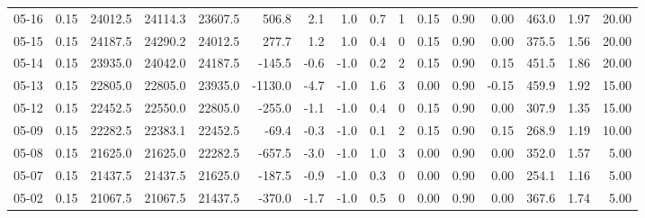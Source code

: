 \begin{threeparttable}
{\begin{tabular}{lrrrrrrrrrrrrrrr}
  05-16 &     0.15 & 24012.5 & 24114.3 & 23607.5 &      506.8 &            2.1 &                      1.0 &                 0.7 &              1 &       0.15 &      0.90 &           0.00 &            463.0 &            1.97 &                  20.00 \\
  05-15 &     0.15 & 24187.5 & 24290.2 & 24012.5 &      277.7 &            1.2 &                      1.0 &                 0.4 &              0 &       0.15 &      0.90 &           0.00 &            375.5 &            1.56 &                  20.00 \\
  05-14 &     0.15 & 23935.0 & 24042.0 & 24187.5 &     -145.5 &           -0.6 &                     -1.0 &                 0.2 &              2 &       0.15 &      0.90 &           0.15 &            451.5 &            1.86 &                  20.00 \\
  05-13 &     0.15 & 22805.0 & 22805.0 & 23935.0 &    -1130.0 &           -4.7 &                     -1.0 &                 1.6 &              3 &       0.00 &      0.90 &          -0.15 &            459.9 &            1.92 &                  15.00 \\
  05-12 &     0.15 & 22452.5 & 22550.0 & 22805.0 &     -255.0 &           -1.1 &                     -1.0 &                 0.4 &              0 &       0.15 &      0.90 &           0.00 &            307.9 &            1.35 &                  15.00 \\
  05-09 &     0.15 & 22282.5 & 22383.1 & 22452.5 &      -69.4 &           -0.3 &                     -1.0 &                 0.1 &              2 &       0.15 &      0.90 &           0.15 &            268.9 &            1.19 &                  10.00 \\
  05-08 &     0.15 & 21625.0 & 21625.0 & 22282.5 &     -657.5 &           -3.0 &                     -1.0 &                 1.0 &              3 &       0.00 &      0.90 &           0.00 &            352.0 &            1.57 &                   5.00 \\
  05-07 &     0.15 & 21437.5 & 21437.5 & 21625.0 &     -187.5 &           -0.9 &                     -1.0 &                 0.3 &              0 &       0.00 &      0.90 &           0.00 &            254.1 &            1.16 &                   5.00 \\
  05-02 &     0.15 & 21067.5 & 21067.5 & 21437.5 &     -370.0 &           -1.7 &                     -1.0 &                 0.5 &              0 &       0.00 &      0.90 &           0.00 &            367.6 &            1.74 &                   5.00 \\

\end{tabular}}
\end{threeparttable}

